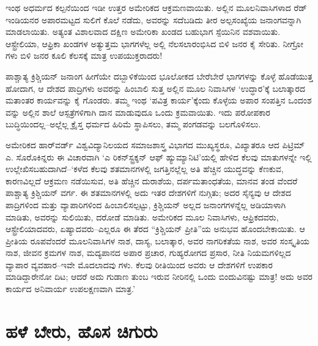 ಇಂಥ ಅಧರ್ಮದ ಕಲ್ಪನೆಯಿಂದ ಇಡೀ ಉತ್ತರ ಅಮೇರಿಕದ ಆಕ್ರಮಣವಾಯಿತು. ಅಲ್ಲಿನ ಮೂಲನಿವಾಸಿಗಳಾದ ರೆಡ್ ಇಂಡಿಯನರ ಅಪಾರಮಟ್ಟದ ಸುಲಿಗೆ ಕೊಲೆ ನಡೆದು, ಅವರನ್ನು ಸದೆಬಡಿದು ತೀರ ಅಲ್ಪಸಂಖ್ಯೆಯ ಜನಾಂಗವನ್ನಾಗಿ ಮಾಡಲಾಯಿತು. ಅತ್ಯಂತ ವಿಶಾಲವಾದ ದಕ್ಷಿಣ ಅಮೇರಿಕಾ ಖಂಡದ ಬಹುಭಾಗ ಸ್ಪೆಯಿನಿನ ವಶವಾಯಿತು. ಆಸ್ಟ್ರೇಲಿಯಾ, ಆಫ್ರಿಕಾ ಖಂಡಗಳ ಅತ್ಯುತ್ತಮ ಭಾಗಗಳೆಲ್ಲ ಅಲ್ಲಿ ನೆಲಸಲಾರಂಭಿಸಿದ ಬಿಳಿ ಜನರ ಕೈ ಸೇರಿತು. ನೀಗ್ರೋ ಗಳು ಬಿಳಿ ಜನರ ಕೂಲಿ ಕೆಲಸಕ್ಕೆ ಮಾತ್ರ ಉಪಯುಕ್ತರಾದರು!

ಪಾಶ್ಚಾತ್ಯ ಕ್ರಿಶ್ಚಿಯನ್​ ಜನಾಂಗ ಹೀಗೆಯೇ ದಬ್ಬಾಳಿಕೆಯಿಂದ ಭೂಲೋಕದ ಬೇರೆಬೇರೆ ಭಾಗಗಳನ್ನು ಕೊಳ್ಳೆ ಹೊಡೆಯುತ್ತ ಹೋದಾಗ, ಆ ದೇಶದ ಪಾದ್ರಿಗಳು ಅವರನ್ನು ಹಿಂಬಾಲಿ ಸುತ್ತ ಅಲ್ಲಿನ ಮೂಲ ನಿವಾಸಿಗಳ ‘ಉದ್ಧಾರ’ಕ್ಕೆ ಬಲಾತ್ಕಾರದ ಮತಾಂತರ ಕಾರ್ಯವನ್ನು ಕೈ ಗೊಂಡರು. ತಮ್ಮ ಇಂಥ ‘ಪವಿತ್ರ ಕಾರ್ಯ’ಕ್ಕೆಂದು ಕೊಳ್ಳೆಯ ಅಪಾರ ಸಂಪತ್ತಿನ ಒಂದಂಶ ವನ್ನು ಅಲ್ಲಿನ ಶಾಲೆ ಆಸ್ಪತ್ರೆಗಳಿಗಾಗಿ ದಾನ ಮಾಡುವುದೂ ಒಂದು ಕ್ರಮವಾಯಿತು. ಇದು ಪರೋಪಕಾರ ಬುದ್ಧಿಯಿಂದಲ್ಲ–ಅಲ್ಲೆಲ್ಲ ಕ್ರೈಸ್ತ ಧರ್ಮದ ಹಿರಿಮೆ ಸ್ಥಾಪಿಸಲು, ತಮ್ಮ ಪಂಗಡವನ್ನು ಬಲಗೊಳಿಸಲು.

ಅಮೇರಿಕದ ಹಾರ್​ವರ್ಡ್ ವಿಶ್ವವಿದ್ಯಾನಿಲಯದ ಸಮಾಜಶಾಸ್ತ್ರ ವಿಭಾಗದ ಮುಖ್ಯಸ್ಥರೂ, ವಿಖ್ಯಾತರೂ ಆದ ಪಿಟ್ರಿಮ್ ಎ. ಸೊರೊಕಿನ್ನರು ಈ ವಿಚಾರವಾಗಿ ‘ಎ ರಿಕನ್​ಸ್ಟ್ರಕ್ಶನ್ ಆಫ್ ಹ್ಯುಮ್ಯಾನಿಟಿ’ಯಲ್ಲಿ ಹೇಳಿದ ಕೆಲವು ಮಾತುಗಳನ್ನೇ ಇಲ್ಲಿ ಉಲ್ಲೇಖಿಸಬಹುದಾಗಿದೆ–‘ಕಳೆದ ಕೆಲವು ಶತಮಾನಗಳಲ್ಲಿ ಜಗತ್ತಿನಲ್ಲೆಲ್ಲ ಅತಿ ಹೆಚ್ಚಿನ ಯುದ್ಧವನ್ನು ಕೆಣಕುವ, ಕಾರಣವಿಲ್ಲದೆ ಆಕ್ರಮಣ ನಡೆಯಿಸುವ, ಅತಿ ಹೆಚ್ಚಿನ ದುರಾಶೆಯ, ದರ್ಪಮತಾಂಧತೆಯ, ಮಾನವ ತಂಡ ವೆಂದರೆ ಪಾಶ್ಚಾತ್ಯ ಕ್ರಿಶ್ಚಿಯನ್​ ವರ್ಗ. ಈ ಶತಮಾನಗಳಲ್ಲಿ ಅದು ಇತರ ದೇಶಗಳಿಗೆ ನುಗ್ಗಿತು; ಅದರ ಸೈನ್ಯವು ಆ ದೇಶದ ಪಾದ್ರಿಗಳಿಂದ ಮತ್ತು ವ್ಯಾಪಾರಿಗಳಿಂದ ಹಿಂಬಾಲಿಸಲ್ಪಟ್ಟು, ಕ್ರಿಶ್ಚಿಯನ್ ಅಲ್ಲದ ಜನಾಂಗಗಳನ್ನೆಲ್ಲ ಅಡಿಯಾಳಾಗಿ ಮಾಡಿತು, ಅವರನ್ನು ಸುಲಿಯಿತು, ದರೋಡೆ ಮಾಡಿತು. ಅಮೇರಿಕದ ಮೂಲ ನಿವಾಸಿಗಳು, ಆಫ್ರಿಕದವರು, ಆಸ್ಟ್ರೇಲಿಯಾದವರು, ಏಷ್ಯಾದವರು–ಎಲ್ಲರೂ ಈ ತೆರದ “ಕ್ರಿಶ್ಚಿಯನ್ ಪ್ರೀತಿ”ಯ ಅನುಭವ ಹೊಂದಬೇಕಾಯಿತು. ಆ ಪ್ರೀತಿಯ ರೂಪವೆಂದರೆ ಮೂಲನಿವಾಸಿಗಳ ನಾಶ, ದಾಸ್ಯ, ಬಲಾತ್ಕಾರ, ಅವರ ನಾಗರಿಕತೆಯ ನಾಶ, ಅವರ ಸಂಸ್ಕೃತಿಯ ನಾಶ, ಜೀವನ ಕ್ರಮಗಳ ನಾಶ, ಮದ್ಯಪಾನದ ಅಪಾರ ಪ್ರಚಾರ, ಗುಹ್ಯರೋಗದ ಪ್ರಸಾರ, ನೀತಿ ನಿಯಮಗಳಿಲ್ಲದ ವ್ಯಾಪಾರ ವ್ಯವಹಾರ–ಇವೇ ಮೊದಲಾದವು ಗಳು. ಕೆಲವು ರೀತಿಯಿಂದ ಅವರು ಆ ದೇಶಗಳಿಗೆ ಉಪಕಾರ ಮಾಡಿದ್ದಾರೇನೋ ದಿಟ; ಆದರೆ ಅದು ಗುಡಾಣ ತುಂಬ ಇರುವ ನೀರಿನಲ್ಲಿ ಒಂದು ಬಿಂದುವಿನಷ್ಟು ಮಾತ್ರ! ಅದು ಅವರ ಕಾರ್ಯದ ಅನಿವಾರ್ಯ ಉಪಲಕ್ಷಣವಾಗಿ ಮಾತ್ರ.’


\section{ಹಳೆ ಬೇರು, ಹೊಸ ಚಿಗುರು}

